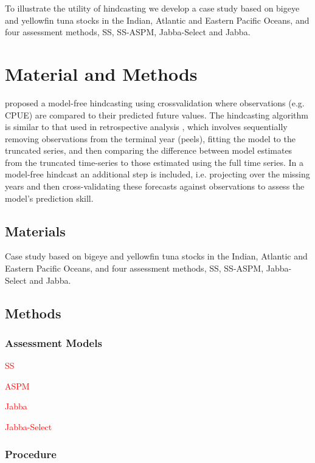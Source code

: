 \documentclass[a4paper]{article}
\newcommand{\laurie}{\textcolor{red}}
\newcommand{\laurie}{\textcolor{darkred}}
\begin{document}
To illustrate the utility of hindcasting we develop a case study based on bigeye and yellowfin tuna stocks in the Indian, Atlantic and Eastern Pacific Oceans, and four assessment methods, SS, SS-ASPM, Jabba-Select and Jabba. 

\section{Material and Methods}

\cite{kell2016xval} proposed a model-free hindcasting using crossvalidation where observations (e.g. CPUE) are compared to their predicted future values. The hindcasting algorithm is similar to that used in retrospective analysis \citep{Hurtado2014, carvalho}, which involves sequentially removing  observations from the terminal year (peels), fitting the model to the truncated series, and then comparing the difference between model estimates from the truncated time-series to those estimated using the full time series. In a model-free hindcast an additional step is included, i.e. projecting over the missing years and then cross-validating these forecasts against observations to assess the model’s prediction skill.

\subsection{Materials}

Case study based on bigeye and yellowfin tuna stocks in the Indian, Atlantic and Eastern Pacific Oceans, and four assessment methods, SS, SS-ASPM, Jabba-Select and Jabba. 

\subsection{Methods}

\subsubsection{Assessment Models}

\laurie{
\begin{description}
\item{SS}
\item{ASPM}
\item{Jabba}
\item{Jabba-Select}
\end{description}}


\subsubsection{Procedure}
\end{document}
